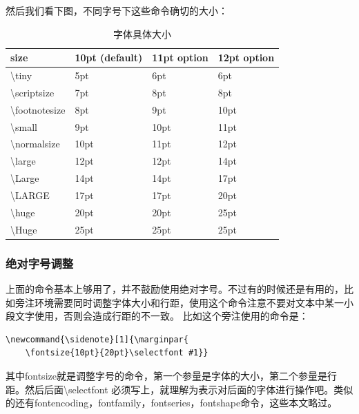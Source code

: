 \documentclass[11pt,oneside]{book}
\begin{document}
然后我们看下图，不同字号下这些命令确切的大小：

\begin{table}[H]
\centering
\begin{tabular}{@{}llll@{}}
\toprule 
size          & 10pt (default) & 11pt option & 12pt option \\ \midrule
\textbackslash tiny         & 5pt            & 6pt         & 6pt         \\
\textbackslash scriptsize   & 7pt            & 8pt         & 8pt         \\
\textbackslash footnotesize & 8pt            & 9pt         & 10pt        \\
\textbackslash small        & 9pt            & 10pt        & 11pt        \\
\textbackslash normalsize   & 10pt           & 11pt        & 12pt        \\
\textbackslash large        & 12pt           & 12pt        & 14pt        \\
\textbackslash Large        & 14pt           & 14pt        & 17pt        \\
\textbackslash LARGE        & 17pt           & 17pt        & 20pt        \\
\textbackslash huge         & 20pt           & 20pt        & 25pt        \\
\textbackslash Huge         & 25pt           & 25pt        & 25pt        \\ \bottomrule
\end{tabular}
\label{tab:字体具体大小}
\caption{字体具体大小}
\end{table}


\subsubsection{绝对字号调整}
上面的命令基本上够用了，并不鼓励使用绝对字号。不过有的时候还是有用的，比如旁注环境需要同时调整字体大小和行距，使用这个命令注意不要对文本中某一小段文字使用，否则会造成行距的不一致。
比如这个旁注使用的命令是：
\begin{Verbatim}
\newcommand{\sidenote}[1]{\marginpar{  
 	\fontsize{10pt}{20pt}\selectfont #1}}
\end{Verbatim}
其中fontsize就是调整字号的命令，第一个参量是字体的大小，第二个参量是行距。然后后面\textbackslash selectfont 必须写上，就理解为表示对后面的字体进行操作吧。类似的还有fontencoding，fontfamily，fontseries，fontshape命令，这些本文略过。
\end{document}
